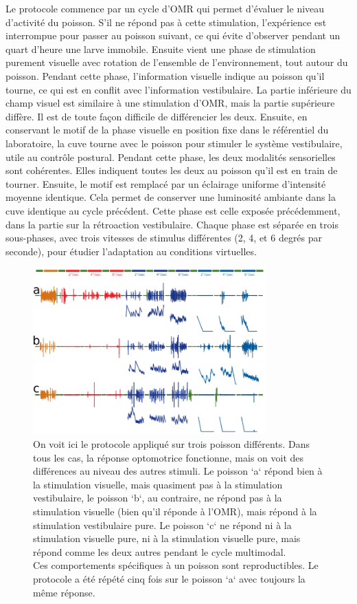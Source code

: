 Le protocole commence par un cycle d'OMR qui permet d'évaluer le niveau d'activité du poisson. S'il ne répond pas à cette stimulation, l'expérience est interrompue pour passer au poisson suivant, ce qui évite d'observer pendant un quart d'heure une larve immobile. Ensuite vient une phase de stimulation purement visuelle avec rotation de l'ensemble de l'environnement, tout autour du poisson. Pendant cette phase, l'information visuelle indique au poisson qu'il tourne, ce qui est en conflit avec l'information vestibulaire. La partie inférieure du champ visuel est similaire à une stimulation d'OMR, mais la partie supérieure diffère. Il est de toute façon difficile de différencier les deux. Ensuite, en conservant le motif de la phase visuelle en position fixe dans le référentiel du laboratoire, la cuve tourne avec le poisson pour stimuler le système vestibulaire, utile au contrôle postural. Pendant cette phase, les deux modalités sensorielles sont cohérentes. Elles indiquent toutes les deux au poisson qu'il est en train de tourner. Ensuite, le motif est remplacé par un éclairage uniforme d'intensité moyenne identique. Cela permet de conserver une luminosité ambiante dans la cuve identique au cycle précédent. Cette phase est celle exposée précédemment, dans la partie sur la rétroaction vestibulaire. Chaque phase est séparée en trois sous-phases, avec trois vitesses de stimulus différentes (2, 4, et 6 degrés par seconde), pour étudier l'adaptation au conditions virtuelles.

\begin{figure}
\centering
\includegraphics[width=0.8\textwidth]{./files/raw_data.svg.png}
\caption{
On voit ici le protocole appliqué sur trois poisson différents. Dans tous les cas, la réponse optomotrice fonctionne, mais on voit des différences au niveau des autres stimuli. Le poisson `a` répond bien à la stimulation visuelle, mais quasiment pas à la stimulation vestibulaire, le poisson `b`, au contraire, ne répond pas à la stimulation visuelle (bien qu'il réponde à l'OMR), mais répond à la stimulation vestibulaire pure. Le poisson `c` ne répond ni à la stimulation visuelle pure, ni à la stimulation visuelle pure, mais répond comme les deux autres pendant le cycle multimodal.
\\
Ces comportements spécifiques à un poisson sont reproductibles. Le protocole a été répété cinq fois sur le poisson `a` avec toujours la même réponse.
}
\end{figure}

